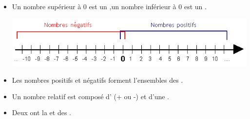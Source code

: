 \documentclass[xcolor={dvipsnames}]{beamer}
\begin{document}
\begin{frame}
	\begin{mydefs}
		\begin{itemize}
			\item Un nombre supérieur à 0 est \pause un ,\pause un nombre inférieur à 0 est un .
			
			\begin{center}
				\includegraphics[scale=0.5]{relatifs}\pause
			\end{center}
			
			\item Les nombres positifs et négatifs forment l'ensembles des .\pause
			
			\item Un nombre relatif est composé d' (+ ou -) et d'une .\pause
			
			\item Deux  ont la  et des . 
			
			
		\end{itemize}
	\end{mydefs}
	
\end{frame}
\end{document}
